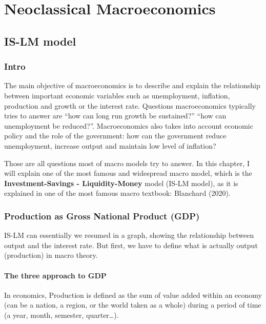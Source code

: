 \documentclass[
  letterpaper,
  DIV=11,
  numbers=noendperiod]{scrreprt}
\begin{document}
\part{Neoclassical Macroeconomics}

\hypertarget{is-lm-model}{%
\chapter{IS-LM model}\label{is-lm-model}}

\hypertarget{intro-1}{%
\section{Intro}\label{intro-1}}

The main objective of macroeconomics is to describe and explain the
relationship between important economic variables such as unemployment,
inflation, production and growth or the interest rate. Questions
macroeconomics typically tries to answer are ``how can long run growth
be sustained?'' ``how can unemployment be reduced?''. Macroeconomics
also takes into account economic policy and the role of the government:
how can the government reduce unemployment, increase output and maintain
low level of inflation?

Those are all questions most of macro models try to answer. In this
chapter, I will explain one of the most famous and widespread macro
model, which is the \textbf{Investment-Savings - Liquidity-Money} model
(IS-LM model), as it is explained in one of the most famous macro
textbook: Blanchard (2020).

\hypertarget{production-as-gross-national-product-gdp}{%
\section{Production as Gross National Product
(GDP)}\label{production-as-gross-national-product-gdp}}

IS-LM can essentially we resumed in a graph, showing the relationship
between output and the interest rate. But first, we have to define what
is actually output (production) in macro theory.

\hypertarget{the-three-approach-to-gdp}{%
\subsection{The three approach to GDP}\label{the-three-approach-to-gdp}}

In economics, Production is defined as the sum of value added within an
economy (can be a nation, a region, or the world taken as a whole)
during a period of time (a year, month, semester, quarter\ldots).
\end{document}

